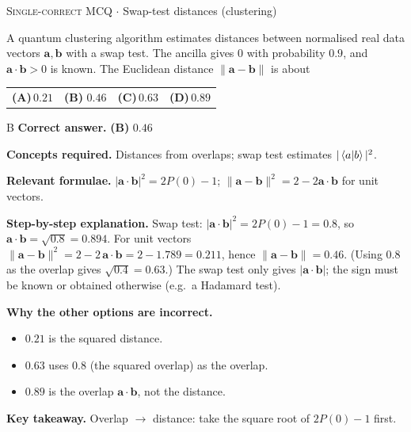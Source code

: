 \documentclass[11pt,a4paper]{article}
\newcommand{\optlabel}[1]{\textbf{(#1)}}
\newcommand{\correctlabel}[1]{\textcolor{okgreen}{\textbf{(#1)}\,\ding{51}}}
\newenvironment{qitem}[1]{\begin{list}{}{\setlength{\leftmargin}{3.3em}\setlength{\labelwidth}{3.1em}%
  \setlength{\labelsep}{0.2em}\setlength{\topsep}{3pt}\setlength{\parsep}{3pt}}\item[\textbf{Q.#1}\hfill]}{\end{list}}
\newcommand{\qsep}{\par\vspace{2pt}{\color{black!15}\hrule}\vspace{4pt}}
\newcommand{\qmeta}[2]{{\footnotesize\color{black!60}\textsc{#1} \;$\cdot$\; #2}\par}
\begin{document}
\begin{qitem}{74}
\qmeta{Single-correct MCQ}{Swap-test distances (clustering)}
A quantum clustering algorithm estimates distances between normalised real data vectors $\mathbf a, \mathbf b$ with a swap test.
The ancilla gives $0$ with probability $0.9$, and $\mathbf a\cdot\mathbf b > 0$ is known. The Euclidean distance $\|\mathbf a - \mathbf b\|$ is about
\par\smallskip\noindent\begin{tabularx}{\linewidth}{@{}*{4}{L}@{}}
\optlabel{A}\,$0.21$ & \correctlabel{B}\,$0.46$ & \optlabel{C}\,$0.63$ & \optlabel{D}\,$0.89$
\end{tabularx}
\end{qitem}
\begin{solbox}{B}
\textbf{\color{brand}Correct answer.} \textcolor{okgreen}{\textbf{(B)}} $0.46$

\textbf{\color{brand}Concepts required.} Distances from overlaps; swap test estimates $|\braket{a|b}|^2$.

\textbf{\color{brand}Relevant formulae.} $|\mathbf a\cdot\mathbf b|^2 = 2P(0) - 1$; $\|\mathbf a - \mathbf b\|^2 = 2 - 2\mathbf a\cdot\mathbf b$ for unit vectors.

\textbf{\color{brand}Step-by-step explanation.} Swap test: $|\mathbf a\cdot\mathbf b|^2 = 2P(0) - 1 = 0.8$, so $\mathbf a\cdot\mathbf b = \sqrt{0.8} = 0.894$.
For unit vectors $\|\mathbf a - \mathbf b\|^2 = 2 - 2\,\mathbf a\cdot\mathbf b = 2 - 1.789 = 0.211$, hence $\|\mathbf a - \mathbf b\| = 0.46$.
(Using $0.8$ as the overlap gives $\sqrt{0.4} = 0.63$.) The swap test only gives $|\mathbf a\cdot\mathbf b|$; the sign must be known
or obtained otherwise (e.g.\ a Hadamard test).

\textbf{\color{brand}Why the other options are incorrect.}
\begin{itemize}[leftmargin=2.4em, itemsep=1pt, topsep=2pt]
\item[\textbf{(A)}] $0.21$ is the squared distance.
\item[\textbf{(C)}] $0.63$ uses $0.8$ (the squared overlap) as the overlap.
\item[\textbf{(D)}] $0.89$ is the overlap $\mathbf a\cdot\mathbf b$, not the distance.
\end{itemize}
\textbf{\color{brand}Key takeaway.} Overlap $\to$ distance: take the square root of $2P(0) - 1$ first.
\end{solbox}
\qsep
\end{document}
